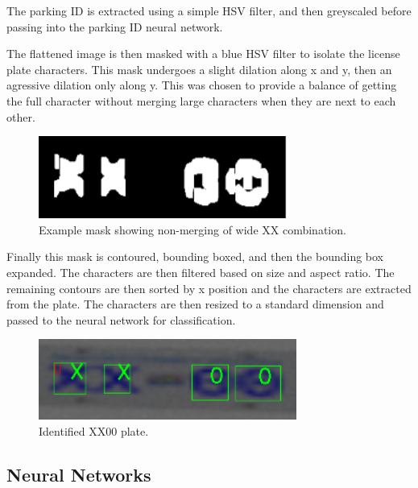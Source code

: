 \documentclass[titlepage, twocolumn]{article}
\begin{document}
The parking ID is extracted using a simple HSV filter, and then greyscaled before passing into the parking ID neural network.

The flattened image is then masked with a blue HSV filter to isolate the license plate characters. This mask undergoes a slight dilation along x and y, then an agressive dilation only along y. This was chosen to provide a balance of getting the full character without merging large characters when they are next to each other. 

\begin{figure}[H]
\centering
\includegraphics[width=\linewidth]{XX00 mask.png}
\caption{Example mask showing non-merging of wide XX combination.}
\label{fig:XX00mask}
\end{figure}

Finally this mask is contoured, bounding boxed, and then the bounding box expanded. The characters are then filtered based on size and aspect ratio. The remaining contours are then sorted by x position and the characters are extracted from the plate. The characters are then resized to a standard dimension and passed to the neural network for classification.

\begin{figure}[H]
\centering
\includegraphics[width=\linewidth]{XX00 identified.png}
\caption{Identified XX00 plate.}
\label{fig:XX00identified}
\end{figure}

\subsection{Neural Networks}
\end{document}
